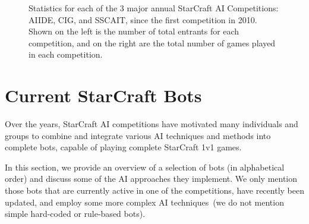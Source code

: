 \begin{figure}[t]
\begin{center}
  \caption{Statistics for each of the 3 major annual StarCraft AI Competitions: AIIDE, CIG, and SSCAIT, since the first competition in 2010. Shown on the left is the number of total entrants for each competition, and on the right are the total number of games played in each competition.  }
  \label{fig:comps}
  \end{center}
  \vspace{-0.5cm}
\end{figure}

\section{Current StarCraft Bots}\label{secBots}

Over the years, StarCraft AI competitions have motivated many individuals and groups to combine and integrate various AI techniques and methods into complete bots, capable of playing complete StarCraft 1v1 games. 

In this section, we provide an overview of a selection of bots (in alphabetical order) and discuss some of the AI approaches they implement. We only mention those bots that are currently active in one of the competitions, have recently been updated, and employ some more complex AI techniques~(we do not mention simple hard-coded or rule-based bots). 





